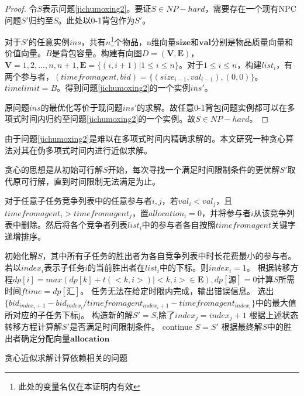 \documentclass[promaster]{thesis-uestc}
\begin{document}
\begin{proof}
    令$S$表示问题\ref{jichumoxing2}。要证$S\in NP-hard$，需要存在一个现有NPC问题$S'$归约至$S$。此处以0-1背包作为$S'$。

    对于$S'$的任意实例$ins$，共有$n$\footnote{此处的变量名仅在本证明内有效}个物品，n维向量$\mathbf{size}$和$\mathbf{val}$分别是物品质量向量和价值向量。$B$是背包容量。构建有向图$D=(\mathbf{V},\mathbf{E})$，$\mathbf{V} = {1,2,...,n,n+1},\mathbf{E} = \{(i,i+1)|1 \leq i \leq n\}$。对于$1 \leq i \leq n$，构建$list_i$，有两个参与者，$(timefromagent,bid) = \{(size_{i-1},val_{i-1}),(0,0)\}$。$timelimit = B$。得到问题\ref{jichumoxing2}的一个实例$ins'$。

    原问题$ins$的最优化等价于现问题$ins'$的求解。故任意0-1背包问题实例都可以在多项式时间内归约至问题\ref{jichumoxing2}的一个实例。故$S\in NP-hard$。
\end{proof}

由于问题\ref{jichumoxing2}是难以在多项式时间内精确求解的。本文研究一种贪心算法对其在伪多项式时间内进行近似求解。

贪心的思想是从初始可行解$S$开始，每次寻找一个满足时间限制条件的更优解$S'$取代原可行解，直到时间限制无法满足为止。

\begin{algorithm}[H]
    对于任意子任务竞争列表中的任意参与者$i,j$，若$val_i < val_j$，且$timefromagent_i > timefromagent_j$，置$allocation_i = 0$，并将参与者$i$从该竞争列表中删除。然后将各个竞争者列表$list_i$中的参与者各自按照$timefromagent$关键字递增排序。\;

    初始化解$S$，其中所有子任务的胜出者为各自竞争列表中时长花费最小的参与者。\;
    若以$index_i$表示子任务$i$的当前胜出者在$list_i$中的下标。则$index_i = 1$。\;
    根据转移方程$dp[i] = max(dp[k]+t(<k,i>)|<k,i> \in \mathbf{E}),dp[\text{源}] = 0$计算$S$所需时间$ftime = dp[\text{汇}]$。\;
    {
        任务无法在给定时限内完成，输出错误信息。\;
    }
    {
        选出$\{bid_{index_i+1}-bid_{index_i}/timefromagent_{index_i+1}-timefromagent_{index_i}\}$中的最大值所对应的子任务下标j。\;
        构造新的解$S' = S$,除了$index_j = index_j+1$\;
        根据上述状态转移方程计算解$S'$是否满足时间限制条件。\;
        {
            continue\;
        }
        $S = S'$\;
    } 
    根据最终解$S$中的胜出者确定分配向量$\mathbf{allocation}$\;
\caption{贪心近似求解计算依赖相关的问题}
\label{jichumoxing2tanxin}
\end{algorithm}
\end{document}
